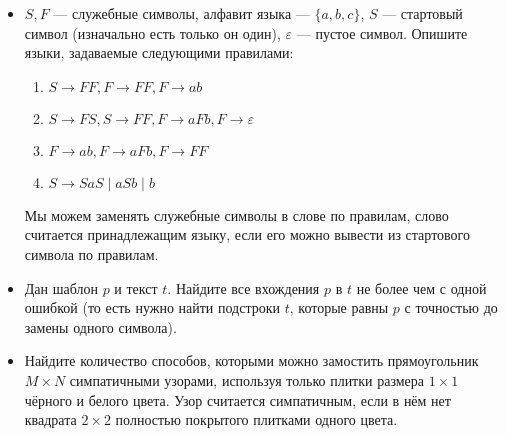 \documentclass[a4paper, 12pt]{article}
\begin{document}
\begin{itemize}
  \item $S, F$ --- служебные символы, алфавит языка --- $\{a,b,c\}$, $S$ --- стартовый символ (изначально есть только он один), $\varepsilon$ --- пустое символ. Опишите языки, задаваемые следующими правилами:
  \begin{enumerate}
    \item $S\to FF, F\to FF, F\to ab$
    \item $S\to FS, S\to FF, F\to aFb, F\to\varepsilon$
    \item $F\to ab, F\to aFb, F\to FF$
    \item $S\to SaS\; |\; aSb\; |\; b$
  \end{enumerate}
  Мы можем заменять служебные символы в слове по правилам, слово считается принадлежащим языку, если его можно вывести из стартового символа по правилам.
  \item Дан шаблон $p$ и текст $t$. Найдите все вхождения $p$ в $t$ не более чем с одной ошибкой (то есть нужно найти подстроки $t$, которые равны $p$ с точностью до замены одного символа).
  \item Найдите количество способов, которыми можно замостить прямоугольник $M \times N$ симпатичными узорами, используя только плитки размера $1 \times 1$ чёрного и белого цвета. Узор считается симпатичным, если в нём нет квадрата $2 \times 2$ полностью покрытого плитками одного цвета.
\end{itemize}
\end{document}
